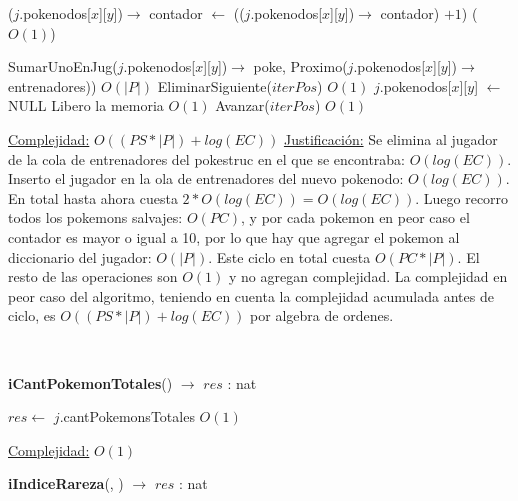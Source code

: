 \begin{Algoritmos}
\begin{algorithmic}[1]
  
  \State ($j$.pokenodos[$x$][$y$])$\rightarrow$ contador $\gets$ (($j$.pokenodos[$x$][$y$])$\rightarrow$ contador) $+ 1$) \Comment($O(1)$)
  
    \State SumarUnoEnJug($j$.pokenodos[$x$][$y$])$\rightarrow$ poke, Proximo($j$.pokenodos[$x$][$y$])$\rightarrow$ entrenadores)) \Comment $O(|P|)$
    \State EliminarSiguiente($iterPos$) \Comment $O(1)$
    \State $j$.pokenodos[$x$][$y$] $\gets$ NULL \Comment Libero la memoria $O(1)$
  \Else 
    \State Avanzar($iterPos$) \Comment $O(1)$ 
  \EndIf

\EndWhile 



\medskip
\Statex \underline{Complejidad:} $O((PS *|P|) + log(EC))$ 
\Statex \underline{Justificaci\'on:} Se elimina al jugador de la cola de entrenadores del pokestruc en el que se encontraba: $O(log(EC))$. Inserto el jugador en la ola de entrenadores del nuevo pokenodo: $O(log(EC))$. En total hasta ahora cuesta $2*O(log(EC)) = O(log(EC))$. Luego recorro todos los pokemons salvajes: $O(PC)$, y por cada pokemon en peor caso el contador es mayor o igual a 10, por lo que hay que agregar el pokemon al diccionario del jugador: $O(|P|)$. Este ciclo en total cuesta $O(PC*|P|)$. El resto de las operaciones son $O(1)$ y no agregan complejidad. La complejidad en peor caso del algoritmo, teniendo en cuenta la complejidad acumulada antes de ciclo, es $O((PS *|P|) + log(EC))$ por algebra de ordenes.
\end{algorithmic}

$ $\newline
$ $\newline



\begin{algorithm}[H]
{\textbf{iCantPokemonTotales}() $\to$ $res$ : nat}
\begin{algorithmic}[1]

\State $res \gets$ $j$.cantPokemonsTotales \Comment $O(1)$

\medskip
\State \underline{Complejidad:} $O(1)$

\end{algorithmic}
\end{algorithm}


\begin{algorithm}[H]
{\textbf{iIndiceRareza}(, ) $\to$ $res$ : nat}
\begin{algorithmic}[1]


\end{algorithmic}
\end{algorithm}
\end{Algoritmos}
